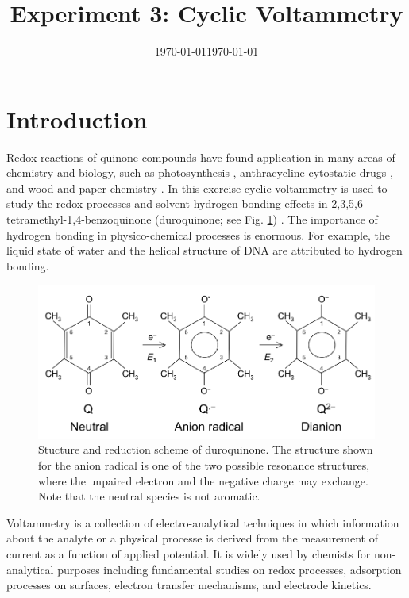 \documentclass[byrevtex,amssymb,aps,pra,floatfix,letterpaper]{revtex4}
\date{\today}
\begin{document}
\title{Experiment 3: Cyclic Voltammetry}

\date{\today}

\maketitle

\section{Introduction}

Redox reactions of quinone compounds have found application in many areas of chemistry and biology, such as photosynthesis \cite{BIOCHEM1}, anthracycline cytostatic drugs \cite{BIOCHEM2}, and wood and paper chemistry \cite{PAPER1}. In this exercise cyclic voltammetry is used to study the redox processes and solvent hydrogen bonding effects in 2,3,5,6-tetramethyl-1,4-benzoquinone (duroquinone; see Fig. \ref{fig1}) \cite{LINSCHITZ,WIGAL,GONZALEZ}. The importance of hydrogen bonding in physico-chemical processes is enormous. For example, the liquid state of water and the helical structure of DNA are attributed to hydrogen bonding.

\begin{figure}[!htp]
\begin{center}
\includegraphics[scale=0.5]{quinone}
\caption{Stucture and reduction scheme of duroquinone. The structure shown for the anion radical is one of the two possible resonance structures, where the unpaired electron and the negative charge may exchange. Note that the neutral species is not aromatic.}
\label{fig1}
\end{center}
\end{figure}

Voltammetry is a collection of electro-analytical techniques in which information about the analyte or a physical processe is derived from the measurement of current as a function of applied potential. It is widely used by chemists for non-analytical purposes including fundamental studies on redox processes, adsorption processes on surfaces, electron transfer mechanisms, and electrode kinetics.
\end{document}
